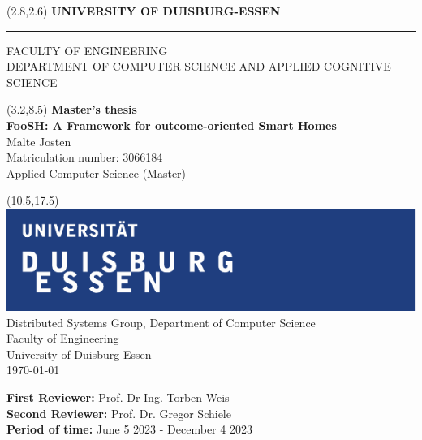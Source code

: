 \begin{titlepage}
\vspace*{-1cm}
\newlength{\links}
\setlength{\links}{0.9cm}
\setlength{\TPHorizModule}{1cm}
\setlength{\TPVertModule}{1cm}
\textblockorigin{0pt}{0pt}

\sffamily
\LARGE

\begin{textblock}{16.5}(2.8,2.6)
 \hspace*{-0.25cm} \textbf{UNIVERSITY OF DUISBURG-ESSEN} \\
 \hspace*{-1.15cm} \rule{5mm}{5mm} \hspace*{0.05cm} FACULTY OF ENGINEERING \\
 \large{}DEPARTMENT OF COMPUTER SCIENCE AND APPLIED COGNITIVE SCIENCE\\
\end{textblock}


\begin{textblock}{14.5}(3.2,8.5)
  \large
{ \textbf{Master's thesis}} \\[1cm]
{\LARGE \Large\textbf{FooSH: A Framework for outcome-oriented Smart Homes}} \\[1.3cm]
Malte Josten\\
Matriculation number: 3066184\\
Applied Computer Science (Master)
\end{textblock}



\begin{textblock}{10}(10.5,17.5)
\includegraphics[scale=1.0]{images/unilogo.pdf}\\
\normalsize
\raggedleft
Distributed Systems Group, Department of Computer Science \\
Faculty of Engineering \\
University of Duisburg-Essen \\[2ex]

\today\\[15ex]
\raggedright
{\textbf{First Reviewer:}} Prof. Dr-Ing. Torben Weis \\
{\textbf{Second Reviewer:}} Prof. Dr. Gregor Schiele \\
{\textbf{Period of time:}} June 5 2023 - December 4 2023 \\
\end{textblock}

\end{titlepage}
